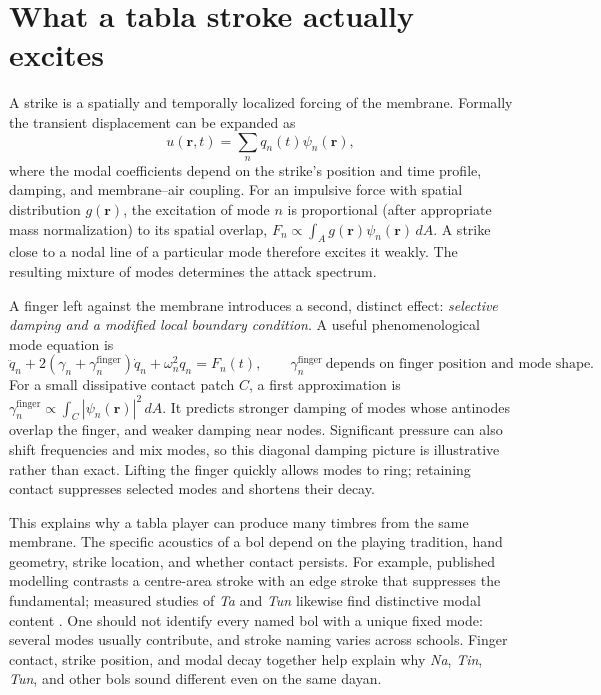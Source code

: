 \documentclass[11pt,letterpaper]{article}
\begin{document}
\section{What a tabla stroke actually excites}
A strike is a spatially and temporally localized forcing of the membrane. Formally the transient displacement can be expanded as
\begin{equation}u(\bm r,t)=\sum_n q_n(t)\psi_n(\bm r),\end{equation}
where the modal coefficients depend on the strike's position and time profile, damping, and membrane--air coupling. For an impulsive force with spatial distribution \(g(\bm r)\), the excitation of mode \(n\) is proportional (after appropriate mass normalization) to its spatial overlap, \(F_n\propto\int_A g(\bm r)\psi_n(\bm r)\,dA\). A strike close to a nodal line of a particular mode therefore excites it weakly. The resulting mixture of modes determines the attack spectrum.

A finger left against the membrane introduces a second, distinct effect: \emph{selective damping and a modified local boundary condition}. A useful phenomenological mode equation is
\begin{equation}
\ddot q_n+2(\gamma_n+\gamma_n^{\mathrm{finger}})\dot q_n+\omega_n^2q_n=F_n(t),
\qquad \gamma_n^{\mathrm{finger}}\ \text{depends on finger position and mode shape}.
\end{equation}
For a small dissipative contact patch \(C\), a first approximation is \(\gamma_n^{\mathrm{finger}}\propto\int_C |\psi_n(\bm r)|^2\,dA\). It predicts stronger damping of modes whose antinodes overlap the finger, and weaker damping near nodes. Significant pressure can also shift frequencies and mix modes, so this diagonal damping picture is illustrative rather than exact. Lifting the finger quickly allows modes to ring; retaining contact suppresses selected modes and shortens their decay.

This explains why a tabla player can produce many timbres from the same membrane. The specific acoustics of a bol depend on the playing tradition, hand geometry, strike location, and whether contact persists. For example, published modelling contrasts a centre-area stroke with an edge stroke that suppresses the fundamental; measured studies of \emph{Ta} and \emph{Tun} likewise find distinctive modal content \cite{air2017,bols2023}. One should not identify every named bol with a unique fixed mode: several modes usually contribute, and stroke naming varies across schools. Finger contact, strike position, and modal decay together help explain why \emph{Na}, \emph{Tin}, \emph{Tun}, and other bols sound different even on the same dayan.
\end{document}
